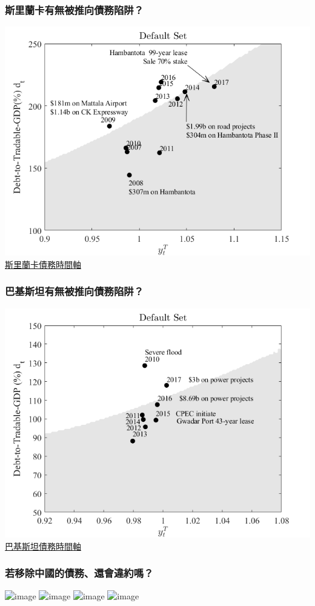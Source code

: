 \documentclass[mathserif]{beamer}
\begin{document}
\begin{frame}
{\begin{columns}
\begin{column}{0.5\textwidth}
            \end{column}
        \end{columns}
        }
    \end{frame}

    \begin{frame}[label = {sri_ds}]
        \frametitle{斯里蘭卡有無被推向債務陷阱？}
        \pause
        \centering
        \includegraphics[width = 0.8 \textwidth]{fig/sri_event.png}\\
        \hfill \hyperlink{sri_ts}{\tiny 斯里蘭卡債務時間軸}
    \end{frame}

    \begin{frame}[label = {pak_ds}]
        \frametitle{巴基斯坦有無被推向債務陷阱？}
        \centering
        \includegraphics[width = 0.8 \textwidth]{fig/pak_event.png}\\
        \hfill \hyperlink{pak_ts}{\tiny 巴基斯坦債務時間軸}
    \end{frame}

    \begin{frame}
        \frametitle{若移除中國的債務、還會違約嗎？}
        \centering
        \includegraphics<1>[width = 0.8 \textwidth]{fig/sri_with_china.png}%
        \includegraphics<2>[width = 0.8 \textwidth]{fig/sri_x_china.png}%
        \includegraphics<3>[width = 0.8 \textwidth]{fig/pak_with_china.png}%
        \includegraphics<4>[width = 0.8 \textwidth]{fig/pak_x_china.png}%
    \end{frame}
\end{document}

